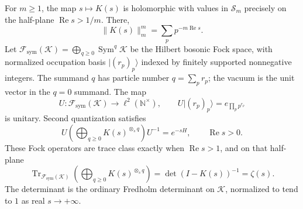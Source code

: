 \begin{theorem}
\label{thm:euler-fredholm}
For \(m\geq1\), the map \(s\mapsto K(s)\) is holomorphic with values
in \(\mathcal S_m\) precisely on the half-plane
\(\operatorname{Re}s>1/m\).  There,
\[
 \|K(s)\|_m^m=\sum_p p^{-m\operatorname{Re}s}.
\]
Let
\(\mathscr F_{\mathrm{sym}}(\mathscr K)=\bigoplus_{q\geq0}\operatorname{Sym}^q
\mathscr K\) be the Hilbert bosonic Fock space, with normalized occupation
basis \(|(r_p)_p\rangle\) indexed by finitely supported nonnegative
integers.  The summand \(q\) has particle number \(q=\sum_p r_p\);
the vacuum is the unit vector in the \(q=0\) summand.  The map
\[
 U:\mathscr F_{\mathrm{sym}}(\mathscr K)\longrightarrow\ell^2(\mathbb N^\times),
 \qquad U|(r_p)_p\rangle=e_{\prod_p p^{r_p}}
\]
is unitary.  Second quantization satisfies
\[
 U\left(\bigoplus_{q\geq0}K(s)^{\otimes_s q}\right)U^{-1}
 =e^{-sH},\qquad \operatorname{Re}s>0.
\]
These Fock operators are trace class exactly when
\(\operatorname{Re}s>1\), and on that half-plane
\[
 \operatorname{Tr}_{\mathscr F_{\mathrm{sym}}(\mathscr K)}
 \left(\bigoplus_{q\geq0}K(s)^{\otimes_s q}\right)
 =\det(I-K(s))^{-1}=\zeta(s).
\]
The determinant is the ordinary Fredholm determinant on \(\mathscr K\),
normalized to tend to \(1\) as real \(s\to+\infty\).
\end{theorem}

